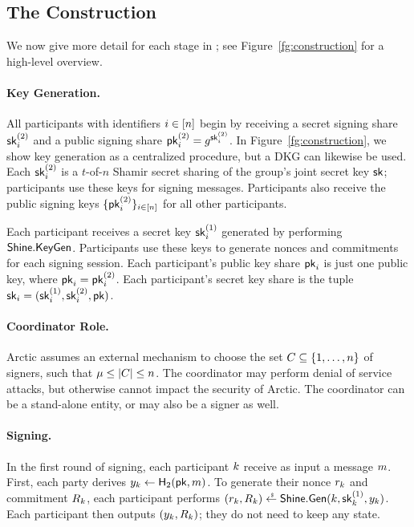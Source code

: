 \subsection{The Construction}

We now give more detail for each stage in \glitter;
see Figure~\ref{fg:construction} for a high-level overview.

\paragraph{\bf Key Generation.}
All participants with identifiers $i \in [n]$ begin by receiving a secret signing share $\mathsf{sk}^{(2)}_i$ and a public signing share $\mathsf{pk}^{(2)}_i = g^{\mathsf{sk}^{(2)}_i}$.
In Figure~\ref{fg:construction},
we show key generation as a centralized procedure,
but a DKG can likewise be used.
Each $\mathsf{sk}^{(2)}_i$ is a $t$-of-$n$ Shamir secret sharing of the group's joint secret key $\mathsf{sk}$;
participants use these keys for signing messages.
Participants also receive the public signing keys $\{ \mathsf{pk}^{(2)}_i \}_{i \in [n]}$ for all other participants.

Each participant receives a secret \DVRFOne key $\mathsf{sk}^{(1)}_i$ generated by performing $\mathsf{Shine}.\mathsf{KeyGen}$.
Participants use these keys to generate nonces and commitments for each signing session.
%
Each participant's public key share $\mathsf{pk}_i$ is just one public key,
where $\mathsf{pk}_i = \mathsf{pk}^{(2)}_i$.
Each participant's secret key share is the tuple $\mathsf{sk}_i = (\mathsf{sk}^{(1)}_i, \mathsf{sk}^{(2)}_i, \mathsf{pk})$.

\paragraph{Coordinator Role.}
Arctic assumes an external mechanism to choose the set
$C \subseteq \{1, \ldots, n \}$ of signers,
such that $\mu \leq \left\lvert C\right\rvert \leq n$.
The coordinator may perform denial of service attacks,
but otherwise cannot impact the security of Arctic.
The coordinator can be a stand-alone entity,
or may also be a signer as well.

\paragraph{\bf Signing.}
In the first round of signing,
each participant $k$ receive as input a message $m$.
First,
each party derives $y_k \gets \mathsf{H}_2(\mathsf{pk}, m)$.
To generate their nonce $r_k$ and commitment $R_k$,
each participant performs
$(r_\partyid, R_\partyid) \rgets \DVRFOnem.\generate(\partyid, \skrand_\partyid, y_\partyid)$.
Each participant then outputs $(y_k, R_k)$;
they do not need to keep any state.


